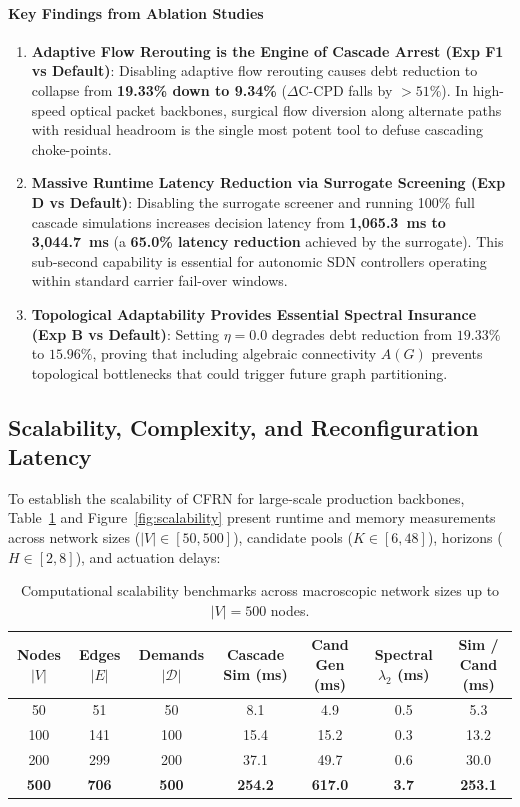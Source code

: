 \documentclass[pdflatex,sn-mathphys-num]{sn-jnl}
\theoremstyle{thmstyleone}
\theoremstyle{thmstyletwo}
\theoremstyle{thmstylethree}
\begin{document}
\paragraph{Key Findings from Ablation Studies}
\begin{enumerate}
    \item \textbf{Adaptive Flow Rerouting is the Engine of Cascade Arrest (Exp F1 vs Default)}: Disabling adaptive flow rerouting causes debt reduction to collapse from \textbf{19.33\% down to 9.34\%} ($\Delta \mathrm{C\text{-}CPD}$ falls by $>51\%$). In high-speed optical packet backbones, surgical flow diversion along alternate paths with residual headroom is the single most potent tool to defuse cascading choke-points.
    \item \textbf{Massive Runtime Latency Reduction via Surrogate Screening (Exp D vs Default)}: Disabling the surrogate screener and running 100\% full cascade simulations increases decision latency from \textbf{1,065.3~ms to 3,044.7~ms} (a \textbf{65.0\% latency reduction} achieved by the surrogate). This sub-second capability is essential for autonomic SDN controllers operating within standard carrier fail-over windows.
    \item \textbf{Topological Adaptability Provides Essential Spectral Insurance (Exp B vs Default)}: Setting $\eta = 0.0$ degrades debt reduction from $19.33\%$ to $15.96\%$, proving that including algebraic connectivity $A(G)$ prevents topological bottlenecks that could trigger future graph partitioning.
\end{enumerate}

\subsection{Scalability, Complexity, and Reconfiguration Latency}\label{sec7.6}
To establish the scalability of CFRN for large-scale production backbones, Table~\ref{tab:scalability} and Figure~\ref{fig:scalability} present runtime and memory measurements across network sizes ($|V| \in [50, 500]$), candidate pools ($K \in [6, 48]$), horizons ($H \in [2, 8]$), and actuation delays:

\begin{table}[t]
\centering
\caption{Computational scalability benchmarks across macroscopic network sizes up to $|V|=500$ nodes.}
\label{tab:scalability}
\begin{tabular}{ccccccc}
\toprule
\textbf{Nodes $|V|$} & \textbf{Edges $|E|$} & \textbf{Demands $|\mathcal{D}|$} & \textbf{Cascade Sim (ms)} & \textbf{Cand Gen (ms)} & \textbf{Spectral $\lambda_2$ (ms)} & \textbf{Sim / Cand (ms)} \\
\midrule
50 & 51 & 50 & 8.1 & 4.9 & 0.5 & 5.3 \\
100 & 141 & 100 & 15.4 & 15.2 & 0.3 & 13.2 \\
200 & 299 & 200 & 37.1 & 49.7 & 0.6 & 30.0 \\
\textbf{500} & \textbf{706} & \textbf{500} & \textbf{254.2} & \textbf{617.0} & \textbf{3.7} & \textbf{253.1} \\
\bottomrule
\end{tabular}
\end{table}
\end{document}
